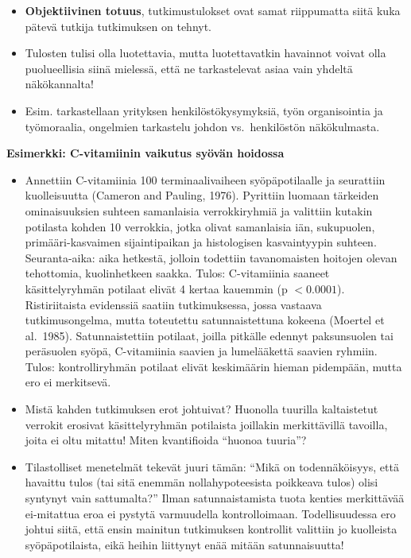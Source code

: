 \documentclass[
]{book}
\providecommand{\tightlist}{%
  \setlength{\itemsep}{0pt}\setlength{\parskip}{0pt}}
\begin{document}
\begin{itemize}
  \begin{itemize}
  \tightlist
  \item
    \textbf{Objektiivinen totuus}, tutkimustulokset ovat samat riippumatta siitä kuka pätevä tutkija tutkimuksen on tehnyt.
  \item
    Tulosten tulisi olla luotettavia, mutta luotettavatkin havainnot voivat olla puolueellisia siinä mielessä, että ne tarkastelevat asiaa vain yhdeltä näkökannalta!
  \item
    Esim. tarkastellaan yrityksen henkilöstökysymyksiä, työn organisointia ja työmoraalia, ongelmien tarkastelu johdon vs.~henkilöstön näkökulmasta.
  \end{itemize}
\end{itemize}

\begin{eblock}{}

\textbf{Esimerkki: C-vitamiinin vaikutus syövän hoidossa}

\begin{itemize}
\item
  Annettiin C-vitamiinia 100 terminaalivaiheen syöpäpotilaalle ja
  seurattiin kuolleisuutta (Cameron and Pauling, 1976). Pyrittiin luomaan tärkeiden ominaisuuksien suhteen samanlaisia verrokkiryhmiä ja valittiin kutakin potilasta kohden 10 verrokkia, jotka olivat samanlaisia iän, sukupuolen, primääri-kasvaimen sijaintipaikan ja histologisen kasvaintyypin suhteen. Seuranta-aika: aika hetkestä, jolloin todettiin tavanomaisten hoitojen olevan tehottomia, kuolinhetkeen saakka. Tulos: C-vitamiinia saaneet käsittelyryhmän potilaat elivät 4 kertaa kauemmin (p \(< 0.0001\)). Ristiriitaista evidenssiä saatiin tutkimuksessa, jossa vastaava tutkimusongelma, mutta toteutettu satunnaistettuna kokeena (Moertel et al.~1985). Satunnaistettiin
  potilaat, joilla pitkälle edennyt paksunsuolen tai peräsuolen syöpä, C-vitamiinia saavien ja lumelääkettä saavien ryhmiin. Tulos: kontrolliryhmän potilaat elivät keskimäärin hieman pidempään, mutta ero ei merkitsevä.
\item
  Mistä kahden tutkimuksen erot johtuivat? Huonolla tuurilla kaltaistetut verrokit erosivat käsittelyryhmän potilaista joillakin merkittävillä tavoilla, joita ei oltu mitattu! Miten kvantifioida ``huonoa tuuria''?
\item
  Tilastolliset menetelmät tekevät juuri tämän: ``Mikä on todennäköisyys, että havaittu tulos (tai sitä enemmän nollahypoteesista poikkeava tulos) olisi syntynyt vain sattumalta?'' Ilman satunnaistamista tuota kenties merkittävää ei-mitattua eroa ei pystytä varmuudella kontrolloimaan. Todellisuudessa ero johtui siitä, että ensin mainitun tutkimuksen kontrollit valittiin jo kuolleista syöpäpotilaista, eikä heihin liittynyt enää mitään satunnaisuutta!
\end{itemize}

\end{eblock}
\end{document}
